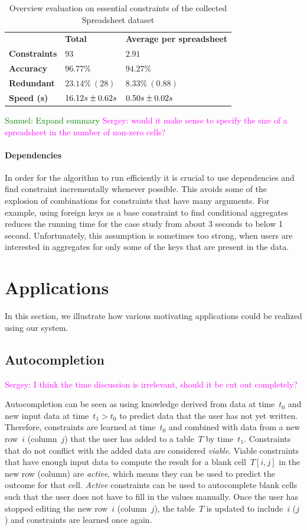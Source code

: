 \documentclass{IEEEtran}
\newcommand{\sergey}[1]{\textcolor{magenta}{{\sc Sergey:} #1}\xspace}
\newcommand{\samuel}[1]{\textcolor{green}{{\sc Samuel:} #1}\xspace}
\theoremstyle{definition}
\begin{document}
\begin{table}
  \centering
  \begin{tabular}{lll}
    & \textbf{Total} & \textbf{Average per spreadsheet} \\
    \textbf{Constraints} & $93$ & $2.91$ \\
    \textbf{Accuracy} & $96.77\%$ & $94.27\%$ \\
    \textbf{Redundant} & $23.14\%~(28)$ & $8.33\%~(0.88)$ \\
    \textbf{Speed (s)} & ${16.12}s \pm {0.62}s$ & ${0.50}s \pm {0.02}s$
  \end{tabular}
  \caption{Overview evaluation on essential constraints of the collected Spreadsheet dataset}
\end{table}
\samuel{Expand summary}
\sergey{would it make sense to specify the size of a spreadsheet in the number of non-zero cells?}

\paragraph{Dependencies}
In order for the algorithm to run efficiently it is crucial to use dependencies and find constraint incrementally whenever possible.
This avoids some of the explosion of combinations for constraints that have many arguments.
For example, using foreign keys as a base constraint to find conditional aggregates reduces the running time for the case study from about 3 seconds to below 1 second.
Unfortunately, this assumption is sometimes too strong, when users are interested in aggregates for only some of the keys that are present in the data.

\section{Applications}\label{sec:applications}
In this section, we illustrate how various motivating applications could be realized using our system.

\subsection{Autocompletion}
\sergey{I think the time discussion is irrelevant, should it be cut out completely?}

Autocompletion can be seen as using knowledge derived from data at time~$t_0$ and new input data at time~$t_1 > t_0$ to predict data that the user has not yet written.
Therefore, constraints are learned at time~$t_0$ and combined with data from a new row~$i$ (column~$j$) that the user has added to a table~$T$ by time~$t_1$.
Constraints that do not conflict with the added data are considered \textit{viable}.
Viable constraints that have enough input data to compute the result for a blank cell~$T[i,j]$ in the new row (column) are \textit{active}, which means they can be used to predict the outcome for that cell.
\textit{Active} constraints can be used to autocomplete blank cells such that the user does not have to fill in the values manually.
Once the user has stopped editing the new row~$i$ (column~$j$), the table~$T$ is updated to include~$i$ ($j$) and constraints are learned once again.
\end{document}

